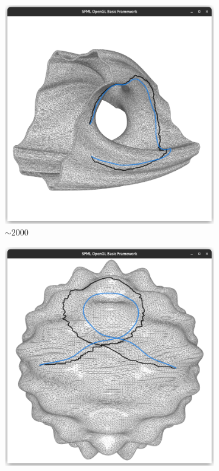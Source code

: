 \documentclass{stdlocal}
\begin{document}
\begin{figure}
  \begin{subfigure}[b]{0.24\linewidth}
    \centering
    \includegraphics[width=\linewidth,trim={15px 20 15 50},clip]{images/julia-smooth-0.5.png}
    \caption{$\sim 2000$}
  \end{subfigure}
  \begin{subfigure}[b]{0.24\linewidth}
    \centering
    \includegraphics[width=\linewidth,trim={15px 20 15 50},clip]{images/harmonic-smooth-0.5.png}

\end{subfigure}
\end{figure}
\end{document}
